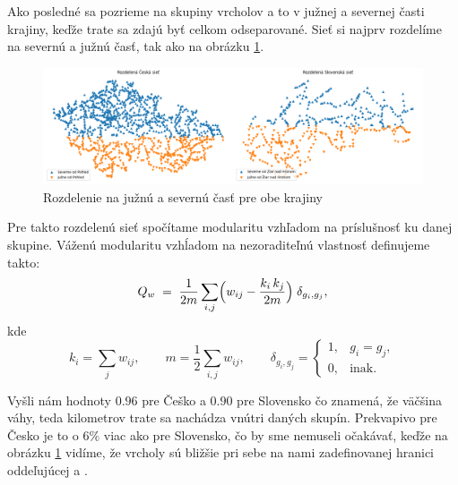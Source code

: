 \documentclass[main.tex]{subfiles}
\begin{document}
Ako posledné sa pozrieme na skupiny vrcholov a to v južnej a severnej časti krajiny, keďže trate sa zdajú byť celkom odseparované. Sieť si najprv rozdelíme na severnú a južnú časť, tak ako na obrázku \ref{obr:split}.

\begin{figure}
    \centerline{\includegraphics[width=1\textwidth]{images/south_north_split.png}}
    \caption{Rozdelenie na južnú a severnú časť pre obe krajiny}
    \label{obr:split}
\end{figure}

Pre takto rozdelenú sieť spočítame modularitu vzhľadom na príslušnosť ku danej skupine. Váženú modularitu vzhĺadom na nezoraditeľnú vlastnosť definujeme takto: 
 \[
Q_w \;=\;
\frac{1}{2m}
\sum_{i,j}
\Bigl(
  w_{ij}
  - \frac{k_i\,k_j}{2m}
\Bigr)
\;\delta_{g_i,g_j},
\]
kde
\[
k_i = \sum_j w_{ij},
\qquad
m = \frac{1}{2}\sum_{i,j}w_{ij},
\qquad
\delta_{g_i,g_j} =
\begin{cases}
1, & g_i = g_j,\\
0, & \text{inak.}
\end{cases}
\]

Vyšli nám hodnoty $0.96$ pre Češko a $0.90$ pre Slovensko čo znamená, že väčšina váhy, teda kilometrov trate sa nachádza vnútri daných skupín. Prekvapivo pre Česko je to o $6\%$ viac ako pre Slovensko, čo by sme nemuseli očakávať, keďže na obrázku \ref{obr:split} vidíme, že vrcholy sú bližšie pri sebe na nami zadefinovanej hranici oddeľujúcej  a .
\end{document}
